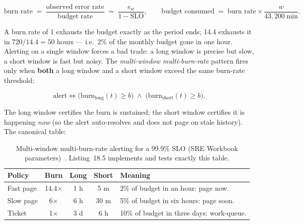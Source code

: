 \begin{equation}
\text{burn rate} \;=\; \frac{\text{observed error rate}}{\text{budget rate}}
\;=\; \frac{e_w}{1 - \text{SLO}} ,
\qquad
\text{budget consumed} \;=\; \text{burn rate} \times \frac{w}{43{,}200\ \text{min}} .
\label{eq:ch18-burnrate}
\end{equation}

A burn rate of 1 exhausts the budget exactly as the period ends; 14.4
exhausts it in $720 / 14.4 = 50$ hours --- i.e.\ 2\% of the monthly budget
gone in one hour. Alerting on a single window forces a bad trade: a long
window is precise but slow, a short window is fast but noisy. The
\emph{multi-window multi-burn-rate} pattern fires only when \textbf{both}
a long window and a short window exceed the same burn-rate threshold:

\begin{equation}
\text{alert} \iff
\bigl(\text{burn}_{\text{long}}(t) \ge b\bigr)
\;\land\;
\bigl(\text{burn}_{\text{short}}(t) \ge b\bigr) .
\label{eq:ch18-mwmb}
\end{equation}

The long window certifies the burn is sustained; the short window
certifies it is happening \emph{now} (so the alert auto-resolves and does
not page on stale history). The canonical table:

\begin{table}[ht]
  \centering
  \small
  \begin{tabularx}{\textwidth}{l c c c X}
    \toprule
    \textbf{Policy} & \textbf{Burn} & \textbf{Long} & \textbf{Short} & \textbf{Meaning} \\
    \midrule
    Fast page & 14.4$\times$ & 1 h  & 5 m  & 2\% of budget in an hour: page now. \\
    Slow page & 6$\times$    & 6 h  & 30 m & 5\% of budget in six hours: page soon. \\
    Ticket    & 1$\times$    & 3 d  & 6 h  & 10\% of budget in three days: work-queue. \\
    \bottomrule
  \end{tabularx}
  \caption{Multi-window multi-burn-rate alerting for a 99.9\% SLO (SRE
  Workbook parameters)~\cite{beyer2016sre}. Listing~18.5 implements and
  tests exactly this table.}
  \label{tab:ch18-burnrate}
\end{table}

